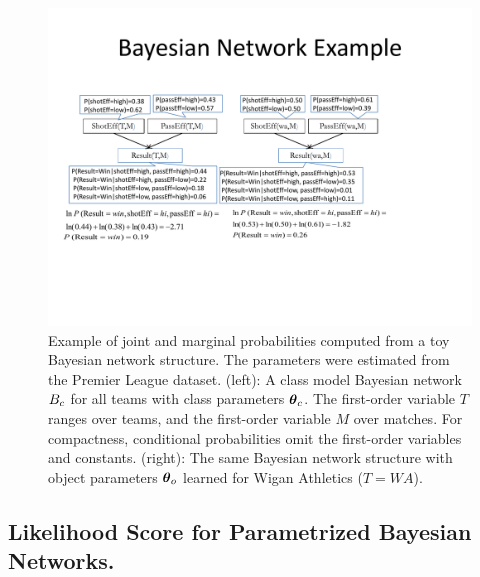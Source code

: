 {{%
 	\begin{figure}[t]
 		\centering
 		\includegraphics[width=1\textwidth] 
 		{wa.pdf}
 		\caption[Example of joint and marginal probabilities computed from a toy Bayesian network structure. ]{Example of joint and marginal probabilities computed from a toy Bayesian network structure. The parameters were estimated from the  Premier League dataset. (left): A class model Bayesian network $B_{c}$ for all teams with class parameters $\boldsymbol{\theta}_{c}$. The first-order variable $T$ ranges over teams, and the first-order variable $M$ over matches. For compactness, conditional probabilities omit the first-order variables and constants. (right): The same Bayesian network structure with object parameters $\boldsymbol{\theta}_{o}$ learned for Wigan Athletics ($T = WA$). 
 			\label{fig:bns}
 		}
 	\end{figure}
			

	\subsection{Likelihood Score for Parametrized Bayesian Networks.}\label{sec:log}
	
}}
